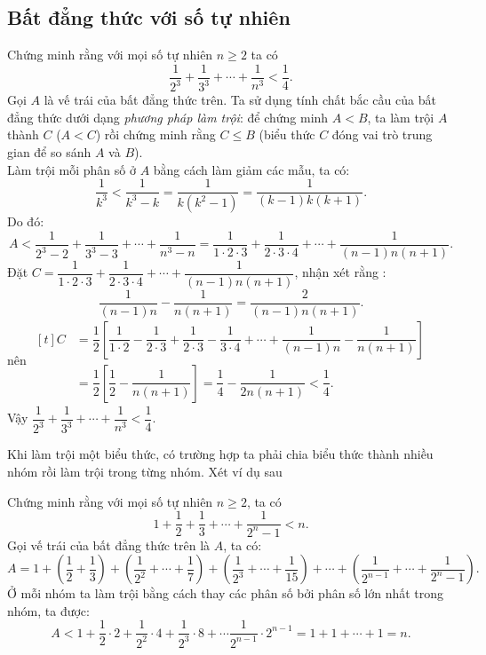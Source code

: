 \subsection{Bất đẳng thức với số tự nhiên}
\begin{vd}%
	Chứng minh rằng với mọi số tự nhiên $n\geq 2$ ta có
	$$\dfrac{1}{2^3}+\dfrac{1}{3^3}+\cdots+\dfrac{1}{n^3}<\dfrac{1}{4}.$$
	\loigiai
	{
	Gọi $A$ là vế trái của bất đẳng thức trên. Ta sử dụng tính chất bắc cầu của bất đẳng thức dưới dạng \textit{phương pháp làm trội}: để chứng minh $A<B$, ta làm trội $A$ thành $C$ ($A<C$) rồi chứng minh rằng $C\leq B$ (biểu thức $C$ đóng vai trò trung gian để so sánh $A$ và $B$).\\
	Làm trội mỗi phân số ở $A$ bằng cách làm giảm các mẫu, ta có:
	$$\dfrac{1}{k^3}<\dfrac{1}{k^3-k}=\dfrac{1}{k\left(k^2-1\right)}=\dfrac{1}{\left(k-1\right)k\left(k+1\right)}.$$
	Do đó: 
	$$A<\dfrac{1}{2^3-2}+\dfrac{1}{3^3-3}+\cdots+\dfrac{1}{n^3-n}=\dfrac{1}{1\cdot 2\cdot 3}+\dfrac{1}{2\cdot 3\cdot 4}+\cdots +\dfrac{1}{(n-1)n(n+1)}.$$
	Đặt $C=\dfrac{1}{1\cdot 2\cdot 3}+\dfrac{1}{2\cdot 3\cdot 4}+\cdots +\dfrac{1}{(n-1)n(n+1)}$, nhận xét rằng : 
	$$\dfrac{1}{(n-1)n}-\dfrac{1}{n(n+1)}=\dfrac{2}{(n-1)n(n+1)}.$$
	nên $\begin{aligned}[t]
	C&=\dfrac{1}{2}\left[\dfrac{1}{1\cdot 2}-\dfrac{1}{2\cdot 3}+\dfrac{1}{2\cdot 3}-\dfrac{1}{3\cdot 4}+\cdots+\dfrac{1}{(n-1)n}-\dfrac{1}{n(n+1)}\right]\\
	&=\dfrac{1}{2}\left[\dfrac{1}{2}-\dfrac{1}{n(n+1)}\right]=\dfrac{1}{4}-\dfrac{1}{2n(n+1)}<\dfrac{1}{4}.
	\end{aligned}$\\
	Vậy $\dfrac{1}{2^3}+\dfrac{1}{3^3}+\cdots+\dfrac{1}{n^3}<\dfrac{1}{4}.$
	}
\end{vd}
\begin{note}
	Khi làm trội một biểu thức, có trường hợp ta phải chia biểu thức thành nhiều nhóm rồi làm trội trong từng nhóm. Xét ví dụ sau
\end{note}
\begin{vd}%
Chứng minh rằng với mọi số tự nhiên $n\geq 2$, ta có 
$$1+\dfrac{1}{2}+\dfrac{1}{3}+\cdots +\dfrac{1}{2^n-1}<n.$$
	\loigiai
	{
	Gọi vế trái của bất đẳng thức trên là $A$, ta có:
	$$A=1+\left(\dfrac{1}{2}+\dfrac{1}{3}\right)+\left(\dfrac{1}{2^2}+\cdots +\dfrac{1}{7}\right)+\left(\dfrac{1}{2^3}+\cdots +\dfrac{1}{15}\right)+\cdots +\left(\dfrac{1}{2^{n-1}}+\cdots +\dfrac{1}{2^n-1}\right).$$
	Ở mỗi nhóm ta làm trội bằng cách thay các phân số bởi phân số lớn nhất trong nhóm, ta được: 
	$$A<1+\dfrac{1}{2}\cdot 2+\dfrac{1}{2^2}\cdot 4+\dfrac{1}{2^3}\cdot 8+\cdots \dfrac{1}{2^{n-1}}\cdot 2^{n-1}=1+1+\cdots +1=n.$$
	}
\end{vd}
